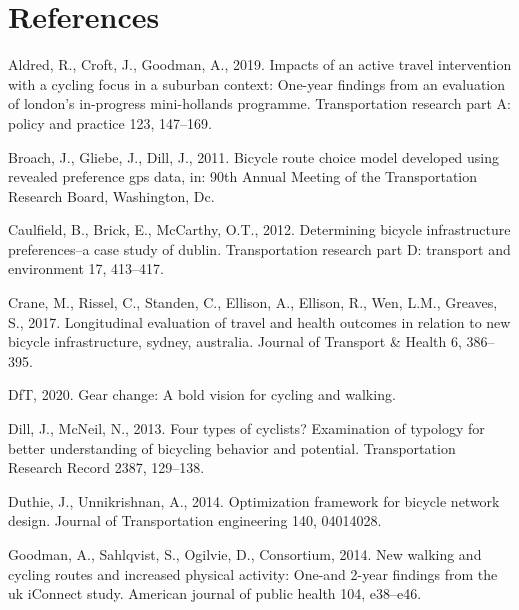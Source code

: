 \documentclass[]{elsarticle} %
\begin{document}
\hypertarget{references}{%
\section*{References}\label{references}}

\setlength{\parindent}{-0.5in}
\setlength{\leftskip}{0.5in}
\setlength{\parskip}{8pt}

\hypertarget{refs}{}
\leavevmode\hypertarget{ref-aldred2019impacts}{}%
Aldred, R., Croft, J., Goodman, A., 2019. Impacts of an active travel
intervention with a cycling focus in a suburban context: One-year
findings from an evaluation of london's in-progress mini-hollands
programme. Transportation research part A: policy and practice 123,
147--169.

\leavevmode\hypertarget{ref-broach2011bicycle}{}%
Broach, J., Gliebe, J., Dill, J., 2011. Bicycle route choice model
developed using revealed preference gps data, in: 90th Annual Meeting of
the Transportation Research Board, Washington, Dc.

\leavevmode\hypertarget{ref-caulfield2012determining}{}%
Caulfield, B., Brick, E., McCarthy, O.T., 2012. Determining bicycle
infrastructure preferences--a case study of dublin. Transportation
research part D: transport and environment 17, 413--417.

\leavevmode\hypertarget{ref-crane2017longitudinal}{}%
Crane, M., Rissel, C., Standen, C., Ellison, A., Ellison, R., Wen, L.M.,
Greaves, S., 2017. Longitudinal evaluation of travel and health outcomes
in relation to new bicycle infrastructure, sydney, australia. Journal of
Transport \& Health 6, 386--395.

\leavevmode\hypertarget{ref-departmentgearchange2020}{}%
DfT, 2020. Gear change: A bold vision for cycling and walking.

\leavevmode\hypertarget{ref-dill2013four}{}%
Dill, J., McNeil, N., 2013. Four types of cyclists? Examination of
typology for better understanding of bicycling behavior and potential.
Transportation Research Record 2387, 129--138.

\leavevmode\hypertarget{ref-duthie2014optimization}{}%
Duthie, J., Unnikrishnan, A., 2014. Optimization framework for bicycle
network design. Journal of Transportation engineering 140, 04014028.

\leavevmode\hypertarget{ref-goodman2014new}{}%
Goodman, A., Sahlqvist, S., Ogilvie, D., Consortium, 2014. New walking
and cycling routes and increased physical activity: One-and 2-year
findings from the uk iConnect study. American journal of public health
104, e38--e46.
\end{document}
